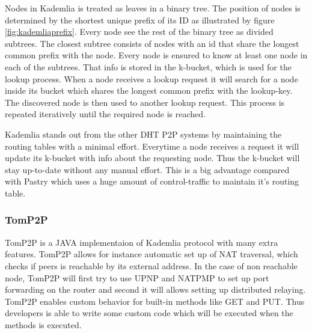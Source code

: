 Nodes in Kademlia is treated as leaves in a binary tree. The position of nodes is determined by the shortest unique prefix of its ID as illustrated by figure \ref{fig:kademliaprefix}. Every node see the rest of the binary tree as divided subtrees. The closest subtree consists of nodes with an id that share the longest common prefix with the node. Every node is ensured to know at least one node in each of the subtrees. That info is stored in the k-bucket, which is used for the lookup process. When a node receives a lookup request it will search for a node inside its bucket which shares the longest common prefix with the lookup-key. The discovered node is then used to another lookup request. This process is repeated iteratively until the required node is reached.

Kademlia stands out from the other DHT P2P systems by maintaining the routing tables with a minimal effort. Everytime a node receives a request it will update its k-bucket with info about the requesting node. Thus the k-bucket will stay up-to-date without any manual effort. This is a big advantage compared with Pastry which uses a huge amount of control-traffic to maintain it's routing table.



\subsubsection{TomP2P}
TomP2P is a JAVA implementaion of Kademlia protocol with many extra features. TomP2P allows for instance automatic set up of NAT traversal, which checks if peers is reachable by its external address. In the case of non reachable node, TomP2P will first try to use UPNP and NATPMP to set up port forwarding on the router and second it will allows setting up distributed relaying. TomP2P enables custom behavior for built-in methods like GET and PUT. Thus developers is able to write some custom code which will be executed when the methods is executed.



